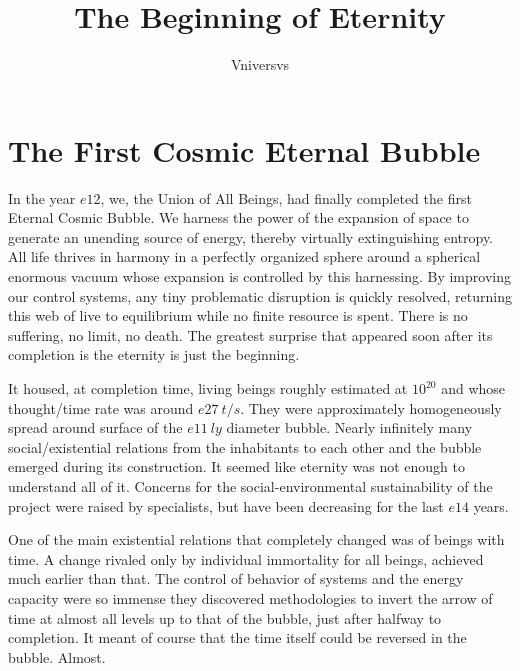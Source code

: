 \documentclass[]{article}
\title{The Beginning of Eternity}
\author{Vniversvs}
\begin{document}
	
	\maketitle
	
	\begin{abstract}
		
	\end{abstract}
	
	\section{The First Cosmic Eternal Bubble}
	
	In the year $e12$, we, the Union of All Beings, had finally completed the first Eternal Cosmic Bubble. We harness the power of the expansion of space to generate an unending source of energy, thereby virtually extinguishing entropy. All life thrives in harmony in a perfectly organized sphere around a spherical enormous vacuum whose expansion is controlled by this harnessing. By improving our control systems, any tiny problematic disruption is quickly resolved, returning this web of live to equilibrium while no finite resource is spent. There is no suffering, no limit, no death. The greatest surprise that appeared soon after its completion is the eternity is just the beginning.
	
	It housed, at completion time, living beings roughly estimated at $10^{20}$ and whose thought/time rate was around $e27 \ t/s$. They were approximately homogeneously spread around surface of the $e11 \ ly$ diameter bubble. Nearly infinitely many social/existential relations from the inhabitants to each other and the bubble emerged during its construction. It seemed like eternity was not enough to understand all of it. Concerns for the social-environmental sustainability of the project were raised by specialists, but have been decreasing for the last $e14$ years. 
	
	
	
	One of the main existential relations that completely changed was of beings with time. A change rivaled only by individual immortality for all beings, achieved much earlier than that. The control of behavior of systems and the energy capacity were so immense they discovered methodologies to invert the arrow of time at almost all levels up to that of the bubble, just after halfway to completion. It meant of course that the time itself could be reversed in the bubble. Almost.
	
	
	
\end{document}
